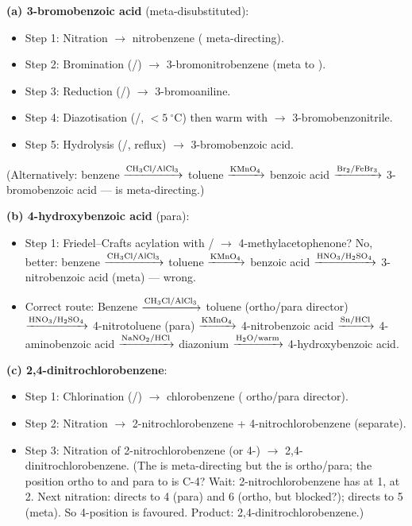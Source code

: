 \documentclass[11pt]{article}
\begin{document}
\begin{corrige}
\textbf{(a) 3-bromobenzoic acid} (meta-disubstituted):
\begin{itemize}
\item Step 1: Nitration $\rightarrow$ nitrobenzene ( meta-directing).
\item Step 2: Bromination (/) $\rightarrow$ 3-bromonitrobenzene (meta to ).
\item Step 3: Reduction (/) $\rightarrow$ 3-bromoaniline.
\item Step 4: Diazotisation (/, $<\SI{5}{\ensuremath{{}^{\circ}\mathrm{C}}}$) then warm with  $\rightarrow$ 3-bromobenzonitrile.
\item Step 5: Hydrolysis (/, reflux) $\rightarrow$ 3-bromobenzoic acid.
\end{itemize}
(Alternatively: benzene $\xrightarrow{\ce{CH3Cl}/\ce{AlCl3}}$ toluene $\xrightarrow{\ce{KMnO4}}$ benzoic acid $\xrightarrow{\ce{Br2}/\ce{FeBr3}}$ 3-bromobenzoic acid —  is meta-directing.)

\textbf{(b) 4-hydroxybenzoic acid} (para):
\begin{itemize}
\item Step 1: Friedel–Crafts acylation with / $\rightarrow$ 4-methylacetophenone? No, better: benzene $\xrightarrow{\ce{CH3Cl}/\ce{AlCl3}}$ toluene $\xrightarrow{\ce{KMnO4}}$ benzoic acid $\xrightarrow{\ce{HNO3}/\ce{H2SO4}}$ 3-nitrobenzoic acid (meta) — wrong.
\item Correct route: Benzene $\xrightarrow{\ce{CH3Cl}/\ce{AlCl3}}$ toluene (ortho/para director) $\xrightarrow{\ce{HNO3}/\ce{H2SO4}}$ 4-nitrotoluene (para) $\xrightarrow{\ce{KMnO4}}$ 4-nitrobenzoic acid $\xrightarrow{\ce{Sn}/\ce{HCl}}$ 4-aminobenzoic acid $\xrightarrow{\ce{NaNO2}/\ce{HCl}}$ diazonium $\xrightarrow{\ce{H2O}/\text{warm}}$ 4-hydroxybenzoic acid.
\end{itemize}

\textbf{(c) 2,4-dinitrochlorobenzene}:
\begin{itemize}
\item Step 1: Chlorination (/) $\rightarrow$ chlorobenzene ( ortho/para director).
\item Step 2: Nitration $\rightarrow$ 2-nitrochlorobenzene + 4-nitrochlorobenzene (separate).
\item Step 3: Nitration of 2-nitrochlorobenzene (or 4-) $\rightarrow$ 2,4-dinitrochlorobenzene. (The  is meta-directing but the  is ortho/para; the position ortho to  and para to  is C-4? Wait: 2-nitrochlorobenzene has  at 1,  at 2. Next nitration:  directs to 4 (para) and 6 (ortho, but blocked?);  directs to 5 (meta). So 4-position is favoured. Product: 2,4-dinitrochlorobenzene.)
\end{itemize}
\end{corrige}
\end{document}
